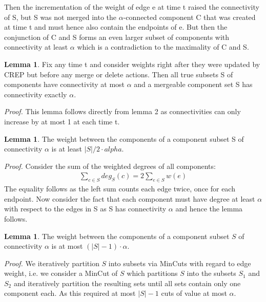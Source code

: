 \documentclass[a4paper,xcolor=dvipsnames, tikz, 12pt]{article}
\newcommand{\crep}{C{\scriptsize REP}}
\theoremstyle{definition}
\newtheorem{lemma}[defi]{Lemma}
\begin{document}
Then the incrementation of the weight of edge e at time t raised the connectivity of S, but S was not merged into the $\alpha$-connected component C that was created at time t and must hence also contain the endpoints of e. But then the conjunction of C and S forms an even larger subset of components with connectivity at least $\alpha$ which is a contradiction to the maximality of C and S. 

\begin{lemma}
	\label{mergeable_lemma}
	Fix any time t and consider weights right after they were updated by \crep{} but before any merge or delete actions. Then all true subsets S of components have connectivity at most $\alpha$ and a mergeable component set S has connectivity exactly $\alpha$.
\end{lemma}

\textit{Proof.} This lemma follows directly from lemma 2 as connectivities can only increase by at most 1 at each time t.

\begin{lemma}
	\label{cut_lemma}
	The weight between the components of a component subset S of connectivity $\alpha$ is at least $|S|/2 \cdot alpha$.
\end{lemma}
\textit{Proof.} Consider the sum of the weighted degrees of all components:
\begin{align*}
\sum_{c\in S}deg_S(c)=2\sum_{e\in S}w(e)
\end{align*}
The equality follows as the left sum counts each edge twice, once for each endpoint.
Now consider the fact that each component must have degree at least $\alpha$ with respect to the edges in S as S has connectivity $\alpha$ and hence the lemma follows.

\begin{lemma}
	\label{cut_lemma_upper}
	The weight between the components of a component subset $S$ of connectivity $\alpha$ is at most $(|S|-1)\cdot\alpha$.
\end{lemma}
\textit{Proof.} We iteratively partition $S$ into subsets via MinCuts with regard to edge weight, i.e. we consider a MinCut of $S$ which partitions $S$ into the subsets $S_1$ and $S_2$ and iteratively partition the resulting sets until all sets contain only one component each. As this required at most $|S|-1$ cuts of value at most $\alpha$.
\end{document}
